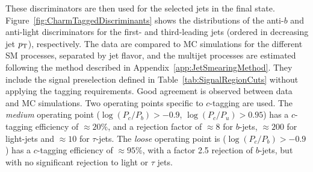 These discriminators are then used for the selected jets in the final state.
Figure~\ref{fig:CharmTaggedDiscriminants} shows the distributions of the anti-$b$ and anti-light discriminators for the first- and third-leading jets (ordered in decreasing jet $p_{\mathrm{T}}$), respectively.
The data are compared to MC simulations for the different SM processes, separated by jet flavor, and the multijet processes are estimated following the method described in Appendix~\ref{app:JetSmearingMethod}.
They include the signal preselection defined in Table~\ref{tab:SignalRegionCuts} without applying the tagging requirements.
Good agreement is observed between data and MC simulations.
Two operating points specific to $c$-tagging are used.
The \emph{medium} operating point ($\log{(P_c/P_b)}>-0.9$, $\log{(P_c/P_u)}>0.95$) has a $c$-tagging efficiency of $\approx 20\%$, and a rejection factor of $\approx 8$ for $b$-jets, $\approx 200$ for light-jets and $\approx 10$ for $\tau$-jets.
The \emph{loose} operating point is ($\log{(P_c/P_b)}>-0.9$) has a $c$-tagging efficiency of $\approx 95\%$, with a factor 2.5 rejection of $b$-jets, but with no significant rejection to light or $\tau$ jets.


